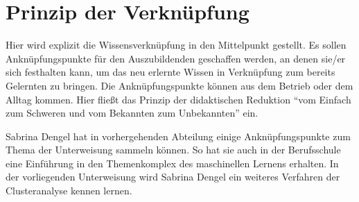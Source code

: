 \section{Prinzip der Verknüpfung}
Hier wird explizit die Wissensverknüpfung in den Mittelpunkt gestellt. Es sollen Anknüpfungspunkte für den Auszubildenden geschaffen werden, an denen sie/er sich festhalten kann, um das neu erlernte Wissen in Verknüpfung zum bereits Gelernten zu bringen. Die Anknüpfungspunkte können aus dem Betrieb oder dem Alltag kommen. Hier fließt das Prinzip der didaktischen Reduktion \enquote{vom Einfach zum Schweren und vom Bekannten zum Unbekannten} ein.
\par
Sabrina Dengel hat in vorhergehenden Abteilung einige Anknüpfungspunkte zum Thema der Unterweisung sammeln können. So hat sie auch in der Berufsschule eine Einführung in den Themenkomplex des maschinellen Lernens erhalten. In der vorliegenden Unterweisung wird Sabrina Dengel ein weiteres Verfahren der Clusteranalyse kennen lernen. 

